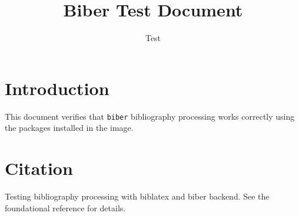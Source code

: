 \documentclass{article}
\title{Biber Test Document}
\author{Test}
\date{}
\begin{document}
\maketitle

\section{Introduction}
This document verifies that \texttt{biber} bibliography processing works correctly
using the packages installed in the image.

\section{Citation}
Testing bibliography processing with biblatex and biber backend.
See the foundational reference \cite{test2025} for details.

\printbibliography
\end{document}
